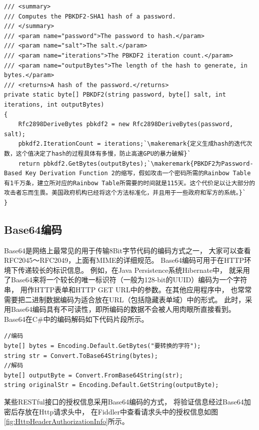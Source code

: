 \documentclass{book}
\newcounter{coderemarks}   %
\newcounter{codevar}     %
\newcommand{\circlemark}[1]{%
\tikz\node[text=white,font=\sffamily\bfseries,inner sep=0.2mm,draw,circle,fill=black]{#1};}
\newcommand{\makeremark}[1]{%
\circlemark{\arabic{coderemarks}}%
\global \expandafter\def \csname codebox\the\value{coderemarks}\endcsname{#1}%
\stepcounter{coderemarks}}
\newcommand{\showremarks}{%
\begin{list}{\circlemark{\arabic{codevar}}} %
{} %
\whiledo{\value{codevar} < \value{coderemarks}}{ %
\item \expandafter\csname codebox\the\value{codevar}\endcsname %
\stepcounter{codevar}} %
\end{list} %
\setcounter{coderemarks}{1}%
\setcounter{codevar}{1}%
}
\begin{document}
\begin{lstlisting}[language={[Sharp]C},caption=根据随机盐和密码生成Hash,label={code:GenerateHashCodeBySaltValue}]
/// <summary>
/// Computes the PBKDF2-SHA1 hash of a password.
/// </summary>
/// <param name="password">The password to hash.</param>
/// <param name="salt">The salt.</param>
/// <param name="iterations">The PBKDF2 iteration count.</param>
/// <param name="outputBytes">The length of the hash to generate, in bytes.</param>
/// <returns>A hash of the password.</returns>
private static byte[] PBKDF2(string password, byte[] salt, int iterations, int outputBytes)
{
    Rfc2898DeriveBytes pbkdf2 = new Rfc2898DeriveBytes(password, salt);
    pbkdf2.IterationCount = iterations;`\makeremark{定义生成hash的迭代次数，这个值决定了hash的过程具体有多慢，防止高速GPU的暴力破解}`
    return pbkdf2.GetBytes(outputBytes);`\makeremark{PBKDF2为Password-Based Key Derivation Function 2的缩写，假如攻击一个密码所需的Rainbow Table有1千万条，建立所对应的Rainbow Table所需要的时间就是115天。这个代价足以让大部分的攻击者忘而生畏。美国政府机构已经将这个方法标准化，并且用于一些政府和军方的系统。}`
}
\end{lstlisting}

\showremarks

\subsection{Base64编码}

Base64是网络上最常见的用于传输8Bit字节代码的编码方式之一，
大家可以查看RFC2045～RFC2049，上面有MIME的详细规范。
Base64编码可用于在HTTP环境下传递较长的标识信息。
例如，在Java Persistence系统Hibernate中，
就采用了Base64来将一个较长的唯一标识符（一般为128-bit的UUID）编码为一个字符串，
用作HTTP表单和HTTP GET URL中的参数。在其他应用程序中，
也常常需要把二进制数据编码为适合放在URL（包括隐藏表单域）中的形式。
此时，采用Base64编码具有不可读性，即所编码的数据不会被人用肉眼所直接看到。
Base64在C\#中的编码解码如下代码片段所示。

\begin{lstlisting}[language={[Sharp]C}]
//编码
byte[] bytes = Encoding.Default.GetBytes("要转换的字符");
string str = Convert.ToBase64String(bytes);
//解码
byte[] outputByte = Convert.FromBase64String(str);
string originalStr = Encoding.Default.GetString(outputByte);
\end{lstlisting}

某些RESTful接口的授权信息采用Base64编码的方式，
将验证信息经过Base64加密后存放在Http请求头中，
在Fiddler中查看请求头中的授权信息如图\ref{fig:HttpHeaderAuthorizationInfo}所示。
\end{document}
